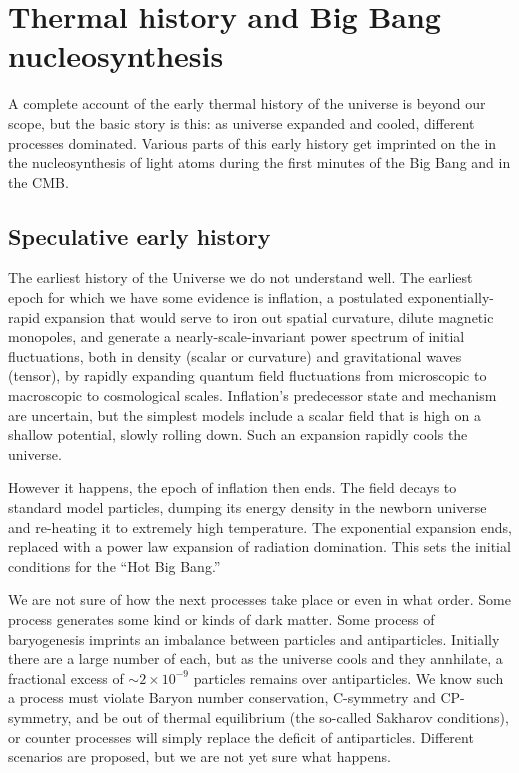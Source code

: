 \chapter{Thermal history and Big Bang nucleosynthesis} \label{ch:thermal_history_and_BBN}

A complete account of the early thermal history of the universe is beyond our scope, but the basic story is this: as universe expanded and cooled, different processes dominated.  Various parts of this early history get imprinted on the in the nucleosynthesis of light atoms during the first minutes of the Big Bang and in the CMB.

\section{Speculative early history}

The earliest history of the Universe we do not understand well.  The earliest epoch for which we have some evidence is inflation, a postulated exponentially-rapid expansion that would serve to iron out spatial curvature, dilute magnetic monopoles, and generate  a nearly-scale-invariant power spectrum of initial fluctuations, both in density (scalar or curvature) and gravitational waves (tensor), by rapidly expanding quantum field fluctuations from microscopic to macroscopic to cosmological scales.  Inflation's predecessor state and mechanism are uncertain, but the simplest models include a scalar field that is high on a shallow potential, slowly rolling down.  Such an expansion rapidly cools the universe.

However it happens, the epoch of inflation then ends.  The field decays to standard model particles, dumping its energy density in the newborn universe and re-heating it to extremely high temperature.    The exponential expansion ends, replaced with a power law expansion of radiation domination.  This sets the initial conditions for the ``Hot Big Bang.''

We are not sure of how the next processes take place or even in what order.  Some process generates some kind or kinds of dark matter.   Some process of baryogenesis imprints an imbalance between particles and antiparticles.  Initially there are a large number of each, but as the universe cools and they annhilate, a fractional excess of $\sim 2\times 10^{-9}$ particles remains over antiparticles.  We know such a process must violate Baryon number conservation, C-symmetry and CP-symmetry, and be out of thermal equilibrium (the so-called Sakharov conditions), or counter processes will simply replace the deficit of antiparticles.  Different scenarios are proposed, but we are not yet sure what happens.

